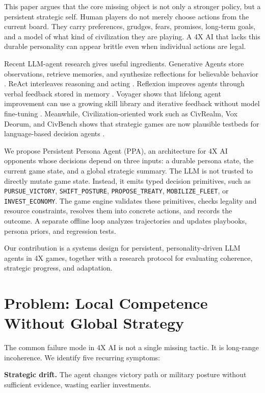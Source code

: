 \documentclass[10pt,twocolumn]{article}
\begin{document}
This paper argues that the core missing object is not only a stronger policy, but a persistent strategic self. Human players do not merely choose actions from the current board. They carry preferences, grudges, fears, promises, long-term goals, and a model of what kind of civilization they are playing. A 4X AI that lacks this durable personality can appear brittle even when individual actions are legal.

Recent LLM-agent research gives useful ingredients. Generative Agents store observations, retrieve memories, and synthesize reflections for believable behavior \cite{park2023generative}. ReAct interleaves reasoning and acting \cite{yao2023react}. Reflexion improves agents through verbal feedback stored in memory \cite{shinn2023reflexion}. Voyager shows that lifelong agent improvement can use a growing skill library and iterative feedback without model fine-tuning \cite{wang2023voyager}. Meanwhile, Civilization-oriented work such as CivRealm, Vox Deorum, and CivBench shows that strategic games are now plausible testbeds for language-based decision agents \cite{qi2024civrealm,chen2025vox,chen2026civbench}.

We propose Persistent Persona Agent (PPA), an architecture for 4X AI opponents whose decisions depend on three inputs: a durable persona state, the current game state, and a global strategic summary. The LLM is not trusted to directly mutate game state. Instead, it emits typed decision primitives, such as \texttt{PURSUE\_VICTORY}, \texttt{SHIFT\_POSTURE}, \texttt{PROPOSE\_TREATY}, \texttt{MOBILIZE\_FLEET}, or \texttt{INVEST\_ECONOMY}. The game engine validates these primitives, checks legality and resource constraints, resolves them into concrete actions, and records the outcome. A separate offline loop analyzes trajectories and updates playbooks, persona priors, and regression tests.

Our contribution is a systems design for persistent, personality-driven LLM agents in 4X games, together with a research protocol for evaluating coherence, strategic progress, and adaptation.

\section{Problem: Local Competence Without Global Strategy}
The common failure mode in 4X AI is not a single missing tactic. It is long-range incoherence. We identify five recurring symptoms:

\textbf{Strategic drift.} The agent changes victory path or military posture without sufficient evidence, wasting earlier investments.
\end{document}
